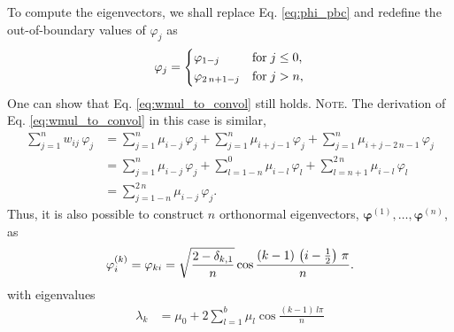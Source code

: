 \documentclass[reprint, floatfix]{revtex4-1}
\newcommand{\note}[1]{{\color{DarkGreen}\footnotesize \textsc{Note.} #1}}
\begin{document}
To compute the eigenvectors,
we shall replace Eq. \eqref{eq:phi_pbc}
and redefine the out-of-boundary values
of $\varphi_j$ as
%
\begin{equation}
  \varphi_j
  =
  \begin{dcases}
    \varphi_{ 1 - j }           & \mathrm{for \;} j \le 0, \\
    \varphi_{ 2 \, n + 1 - j }  & \mathrm{for \;} j > n,
  \end{dcases}
\label{eq:phi_refl}
\end{equation}
%
One can show that Eq. \eqref{eq:wmul_to_convol}
still holds.
%
\note{The derivation of Eq. \eqref{eq:wmul_to_convol}
  in this case is similar,
  $$
  \begin{aligned}
    \sum_{j = 1}^n w_{ij} \, \varphi_j
    &=
    \sum_{j = 1}^n
      \mu_{i - j} \, \varphi_j
    +
    \sum_{j = 1}^n
      \mu_{i + j - 1} \, \varphi_j
    +
    \sum_{j = 1}^n
      \mu_{i + j - 2 \, n - 1} \, \varphi_j
    \\
    &=
    \sum_{j = 1}^n
      \mu_{i - j} \, \varphi_j
    +
    \sum_{l = 1 - n}^0
      \mu_{i - l} \, \varphi_l
    +
    \sum_{l = n + 1}^{ 2 \, n }
      \mu_{i - l} \, \varphi_l
    \\
    &=
    \sum_{j = 1 - n}^{ 2 \, n}
      \mu_{i - j} \, \varphi_j.
  \end{aligned}
  $$
}
%
Thus, it is also possible to construct
$n$ orthonormal eigenvectors,
$\pmb\varphi^{(1)}, \dots, \pmb\varphi^{(n)}$,
as
%
\begin{equation}
\varphi^{(k)}_i
=
\varphi_{k i}
=
\sqrt{
    \frac{ 2 - \delta_{k, 1} }
         {       n           }
     }
   \cos \frac{ ( k - 1) \, \left( i - \frac 1 2 \right) \, \pi}
            {                  n                         }.
\notag
\end{equation}
%
with eigenvalues
%
\begin{align}
  \lambda_k
  &=
  \mu_0
  +
  2
  \sum_{l = 1}^b
    \mu_l
    \cos \frac{(k - 1)  \, l \pi}{n}
  \label{eq:wband_eigenvalue_refl}
\end{align}
%
\end{document}
